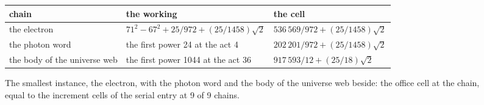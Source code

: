 \begin{figure}[h]
\centering
\begin{adjustbox}{max width=\linewidth}\begin{tabular}{lll}
\hline
chain & the working & the cell \\
\hline
the electron & $71^2 - 67^2 + 25/972 + (25/1458)\sqrt{2}$ & $536\,569/972 + (25/1458)\sqrt{2}$ \\
the photon word & the first power 24 at the act 4 & $202\,201/972 + (25/1458)\sqrt{2}$ \\
the body of the universe web & the first power 1044 at the act 36 & $917\,593/12 + (25/18)\sqrt{2}$ \\
\hline
\end{tabular}\end{adjustbox}
\caption{The smallest instance, the electron, with the photon word and the body of the universe web beside: the office cell at the chain, equal to the increment cells of the serial entry at 9 of 9 chains.}
\end{figure}
\par\medskip{}\label{narr:close:10-6}\par
